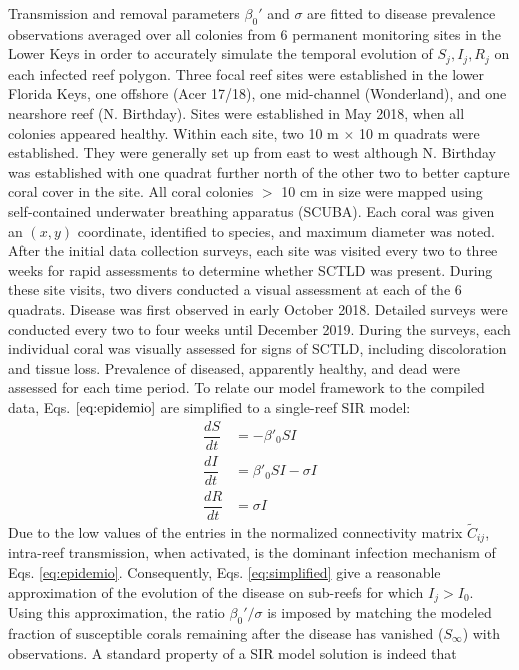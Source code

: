 \documentclass[utf8]{frontiersSCNS}
\begin{document}
Transmission and removal parameters $\beta_0'$ and $\sigma$ are fitted to disease prevalence observations averaged over all colonies from 6 permanent monitoring sites in the Lower Keys in order to accurately simulate the temporal evolution of $S_j,I_j,R_j$ on each infected reef polygon. Three focal reef sites were established in the lower Florida Keys, one offshore (Acer 17/18), one mid-channel (Wonderland), and one nearshore reef (N. Birthday). Sites were established in May 2018, when all colonies appeared healthy. Within each site, two 10 m $\times$ 10 m quadrats were established. They were generally set up from east to west although N. Birthday was established with one quadrat further north of the other two to better capture coral cover in the site. All coral colonies $>$ 10 cm in size were mapped using self-contained underwater breathing apparatus (SCUBA). Each coral was given an $(x,y)$ coordinate, identified to species, and maximum diameter was noted. After the initial data collection surveys, each site was visited every two to three weeks for rapid assessments to determine whether SCTLD was present. During these site visits, two divers conducted a visual assessment at each of the 6 quadrats. Disease was first observed in early October 2018. Detailed surveys were conducted every two to four weeks until December 2019. During the surveys, each individual coral was visually assessed for signs of SCTLD, including discoloration and tissue loss. Prevalence of diseased, apparently healthy, and dead were assessed for each time period. To relate our model framework to the compiled data, Eqs. $\ref{eq:epidemio}$ are simplified to a single-reef SIR model:
\begin{equation}
    \begin{aligned}
        \dfrac{dS}{dt} &= -\beta'_0SI \\
        \dfrac{dI}{dt} &= \beta'_0SI - \sigma I \\
        \dfrac{dR}{dt} &= \sigma I
    \end{aligned}\label{eq:simplified}
\end{equation}
Due to the low values of the entries in the normalized connectivity matrix $\tilde{C}_{ij}$, intra-reef transmission, when activated, is the dominant infection mechanism of Eqs. \ref{eq:epidemio}. Consequently, Eqs. \ref{eq:simplified} give a reasonable approximation of the evolution of the disease on sub-reefs for which $I_j > I_0$. Using this approximation, the ratio $\beta_0'/\sigma$ is imposed by matching the modeled fraction of susceptible corals remaining after the disease has vanished ($S_\infty$) with observations. A standard property of a SIR model solution is indeed that
\end{document}
